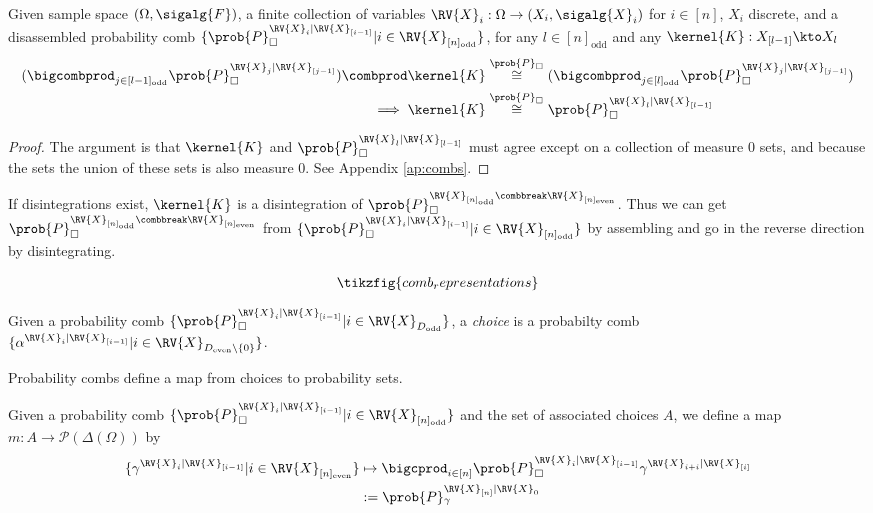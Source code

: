 \begin{theorem}\label{th:comb_equiv}
Given sample space $(\Omega,\sigalg{F})$, a finite collection of variables $\RV{X}_{i}:\Omega\to (X_i,\sigalg{X}_i)$ for $i\in [n]$, $X_i$ discrete, and a disassembled probability comb $\{\prob{P}_\square^{\RV{X}_{i}|\RV{X}_{[i-1]}}|i\in \RV{X}_{[n]_{\text{odd}}}\}$, for any $l\in [n]_{\mathrm{odd}}$ and any $\kernel{K}:X_{[l-1]}\kto X_l$
\begin{align}
    (\bigcombprod_{j\in [l-1]_{\mathrm{odd}}} \prob{P}_\square^{\RV{X}_{j}|\RV{X}_{[j-1]}}) \combprod \kernel{K} &\overset{\prob{P}_\square}{\cong} (\bigcombprod_{j\in [l]_{\mathrm{odd}}} \prob{P}_\square^{\RV{X}_{j}|\RV{X}_{[j-1]}})\\
    \implies \kernel{K} &\overset{\prob{P}_\square}{\cong} \prob{P}_\square^{\RV{X}_{l}|\RV{X}_{[l-1]}}
\end{align}
\end{theorem}

\begin{proof}
The argument is that $\kernel{K}$ and $\prob{P}_\square^{\RV{X}_{l}|\RV{X}_{[l-1]}}$ must agree except on a collection of measure 0 sets, and because the sets the union of these sets is also measure 0. See Appendix \ref{ap:combs}.
\end{proof}

If disintegrations exist, $\kernel{K}$ is a disintegration of $\prob{P}_\square^{\RV{X}_{[n]_{\text{odd}}}\combbreak \RV{X}_{[n]_{\text{even}}}}$. Thus we can get $\prob{P}_\square^{\RV{X}_{[n]_{\text{odd}}}\combbreak \RV{X}_{[n]_{\text{even}}}}$ from $\{\prob{P}_\square^{\RV{X}_{i}|\RV{X}_{[i-1]}}|i\in \RV{X}_{[n]_{\text{odd}}}\}$ by assembling and go in the reverse direction by disintegrating.

\begin{align*}
\tikzfig{comb_representations}
\end{align*}


\begin{definition}[choices]
Given a probability comb $\{\prob{P}_\square^{\RV{X}_{i}|\RV{X}_{[i-1]}}|i\in \RV{X}_{D_{\text{odd}}}\}$, a \emph{choice} is a probabilty comb $\{\alpha^{\RV{X}_{i}|\RV{X}_{[i-1]}}|i\in \RV{X}_{D_{\text{even}}\setminus \{0\}}\}$.
\end{definition}

Probability combs define a map from choices to probability sets.

\begin{definition}
Given a probability comb $\{\prob{P}_\square^{\RV{X}_{i}|\RV{X}_{[i-1]}}|i\in \RV{X}_{[n]_{\text{odd}}}\}$ and the set of associated choices $A$, we define a map $m:A\to \mathscr{P}(\Delta(\Omega))$ by
\begin{align}
    \{\gamma^{\RV{X}_{i}|\RV{X}_{[i-1]}}|i\in \RV{X}_{[n]_{\text{even}}}\}&\mapsto  \bigcprod_{i\in [n]} \prob{P}_\square^{\RV{X}_{i}|\RV{X}_{[i-1]}}\gamma^{\RV{X}_{i+i}|\RV{X}_{[i]}}\\
    &:= \prob{P}_\gamma^{\RV{X}_{[n]}|\RV{X}_0}
\end{align}
\end{definition}

